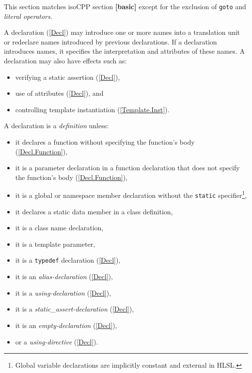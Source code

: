 \p \begin{note}
  This section matches \gls{isoCPP} section \textbf{[basic]} except for the
  exclusion of \texttt{goto} and \textit{literal operators}.
\end{note}


\p A declaration (\ref{Decl}) may introduce one or more names into a translation
unit or redeclare names introduced by previous declarations. If a declaration
introduces names, it specifies the interpretation and attributes of these names.
A declaration may also have effects such as:
\begin{itemize}
\item verifying a static assertion (\ref{Decl}),
\item use of attributes (\ref{Decl}), and
\item controlling template instantiation (\ref{Template.Inst}).
\end{itemize}

\p A declaration is a \textit{definition} unless:
\begin{itemize}
\item it declares a function without specifying the function's body
(\ref{Decl.Function}),
\item it is a parameter declaration in a function declaration that does not
specify the function's body (\ref{Decl.Function}),
\item it is a global or namespace member declaration without the \texttt{static}
specifier\footnote{Global variable declarations are implicitly constant and
external in HLSL.},
\item it declares a static data member in a class definition,
\item it is a class name declaration,
\item it is a template parameter,
\item it is a \texttt{typedef} declaration (\ref{Decl}),
\item it is an \textit{alias-declaration} (\ref{Decl}),
\item it is a \textit{using-declaration} (\ref{Decl}),
\item it is a \textit{static\_assert-declaration} (\ref{Decl}),
\item it is an \textit{empty-declaration} (\ref{Decl}),
\item or a \textit{using-directive} (\ref{Decl}).
\end{itemize}

